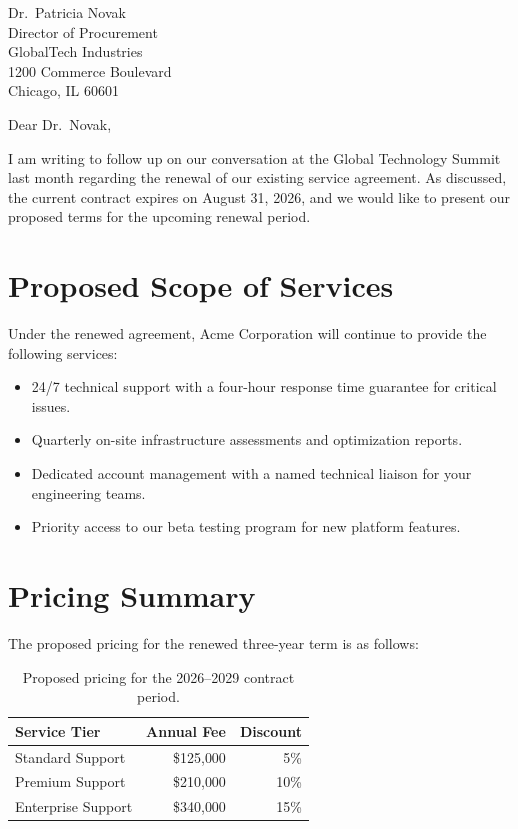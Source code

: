 \documentclass[
    language=english,
    doctype=letter,
    institution=none,
]{../../omnilatex}
\begin{document}
\maketitle

\begin{letter}{Dr.\ Patricia Novak\\
    Director of Procurement\\
    GlobalTech Industries\\
    1200 Commerce Boulevard\\
    Chicago, IL 60601}

\opening{Dear Dr.\ Novak,}

I am writing to follow up on our conversation at the Global Technology Summit
last month regarding the renewal of our existing service agreement. As
discussed, the current contract expires on August 31, 2026, and we would like
to present our proposed terms for the upcoming renewal period.

\section*{Proposed Scope of Services}

Under the renewed agreement, Acme Corporation will continue to provide the
following services:

\begin{itemize}
    \item 24/7 technical support with a four-hour response time guarantee for
          critical issues.
    \item Quarterly on-site infrastructure assessments and optimization reports.
    \item Dedicated account management with a named technical liaison for your
          engineering teams.
    \item Priority access to our beta testing program for new platform features.
\end{itemize}

\section*{Pricing Summary}

The proposed pricing for the renewed three-year term is as follows:

\begin{table}[h]
    \centering
    \begin{tabular}{lrr}
        \toprule
        \textbf{Service Tier} & \textbf{Annual Fee} & \textbf{Discount} \\
        \midrule
        Standard Support  & \$125{,}000 & 5\% \\
        Premium Support   & \$210{,}000 & 10\% \\
        Enterprise Support & \$340{,}000 & 15\% \\
        \bottomrule
    \end{tabular}
    \caption{Proposed pricing for the 2026--2029 contract period.}
\end{table}


\end{letter}
\end{document}
